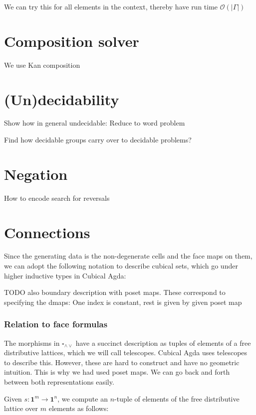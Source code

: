 \documentclass[11pt]{article}
\theoremstyle{definition}
\newcommand{\join}{\wedge}
\newcommand{\meet}{\vee}
\newcommand{\dedekind}{\square_{\join \meet}}
\newcommand{\pint}[1]{\mathbf{1}^{#1}}
\newcommand{\ctxtdim}[1]{|{#1}|}
\begin{document}
We can try this for all elements in the context, thereby have run time
$\mathcal{O}( \ctxtdim{\Gamma} )$

\section{Composition solver}

We use Kan composition


\section{(Un)decidability}

Show how in general undecidable: Reduce to word problem

Find how decidable groups carry over to decidable problems?



\section{Negation}

How to encode search for reversals


\section{Connections}

Since the generating data is the non-degenerate cells and the face maps on them,
we can adopt the following notation to describe cubical sets, which go under
higher inductive types in Cubical Agda:

TODO also boundary description with poset maps. These correspond to specifying
the dmaps: One index is constant, rest is given by given poset map


\subsubsection{Relation to face formulas}

The morphisms in $\dedekind$ have a succinct description as tuples of elements of a free
distributive lattices, which we will call telescopes.
Cubical Agda uses telescopes to describe this. However, these are hard to
construct and have no geometric intuition. This is why we had used poset maps.
We can go back and forth between both representations easily.


Given $s : \pint{m} \to \pint{n}$, we compute an $n$-tuple of elements of the
free distributive lattice over $m$ elements as follows:
\end{document}
